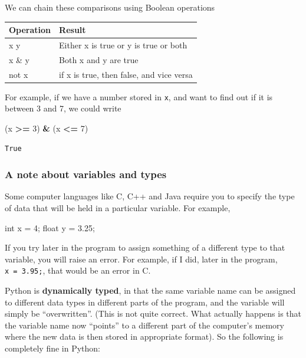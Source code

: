 \documentclass[
  letterpaper,
]{scrbook}
\newenvironment{Shaded}{\begin{snugshade}}{\end{snugshade}}
\newcommand{\DataTypeTok}[1]{\textcolor[rgb]{0.13,0.29,0.53}{#1}}
\newcommand{\DecValTok}[1]{\textcolor[rgb]{0.00,0.00,0.81}{#1}}
\newcommand{\FloatTok}[1]{\textcolor[rgb]{0.00,0.00,0.81}{#1}}
\newcommand{\NormalTok}[1]{#1}
\newcommand{\OperatorTok}[1]{\textcolor[rgb]{0.81,0.36,0.00}{\textbf{#1}}}
\begin{document}
We can chain these comparisons using Boolean operations

\begin{longtable}[]{@{}ll@{}}
\toprule
Operation & Result\tabularnewline
\midrule
\endhead
x \textbar{} y & Either x is true or y is true or both\tabularnewline
x \& y & Both x and y are true\tabularnewline
not x & if x is true, then false, and vice versa\tabularnewline
\bottomrule
\end{longtable}

For example, if we have a number stored in \texttt{x}, and want to find out if it is between 3 and 7, we could write

\begin{Shaded}
\begin{Highlighting}[]
\NormalTok{(x }\OperatorTok{>=} \DecValTok{3}\NormalTok{) }\OperatorTok{&}\NormalTok{ (x }\OperatorTok{<=} \DecValTok{7}\NormalTok{)}
\end{Highlighting}
\end{Shaded}

\begin{verbatim}
True
\end{verbatim}

\hypertarget{a-note-about-variables-and-types}{%
\subsubsection{A note about variables and types}\label{a-note-about-variables-and-types}}

Some computer languages like C, C++ and Java require you to specify the type of data that will be held in a particular variable. For example,

\begin{Shaded}
\begin{Highlighting}[]
\DataTypeTok{int}\NormalTok{ x = }\DecValTok{4}\NormalTok{;}
\DataTypeTok{float}\NormalTok{ y = }\FloatTok{3.25}\NormalTok{;}
\end{Highlighting}
\end{Shaded}

If you try later in the program to assign something of a different type to that variable, you will raise an error. For example, if I did, later in the program, \texttt{x\ =\ 3.95;}, that would be an error in C.

Python is \textbf{dynamically typed}, in that the same variable name can be assigned to different data types in different parts of the program, and the variable will simply be ``overwritten''. (This is not quite correct. What actually happens is that the variable name now ``points'' to a different part of the computer's memory where the new data is then stored in appropriate format). So the following is completely fine in Python:
\end{document}
